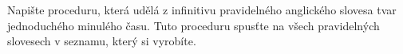 \question[50]
Napište proceduru, která udělá z infinitivu pravidelného anglického slovesa
tvar
jednoduchého minulého času. Tuto proceduru spusťte na všech pravidelných
slovesech v seznamu,
který si vyrobíte.